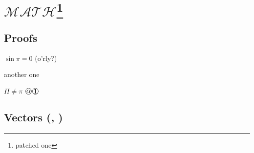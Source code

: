 \documentclass[draft]{article}
\begin{document}
\section{$\mathcal{M\!AT\!H}$\protect\footnote{patched one}}

\subsection{Proofs}
\label{sub:proofs}



\begin{tproof}[kek?]
  $\sin\pi=0$ (o'rly?)
  \begin{lproof}[nested]
    another one
    \begin{pproof}
      $\Pi\neq\pi$
      {%
        \fboxsep=0pt
        \fbox{$\bigcirc$}\fbox{$\mathord{\Rightarrow}\vphantom{<}$}
      }%
      \circlearound{$\mathord{\Rightarrow}\vphantom{>}$}%
      $\circlearound{\alpha}\,\circlearound{1}$
    \end{pproof}
  \end{lproof}
\end{tproof}

\subsection{Vectors (\coori, \conori)}
\end{document}
